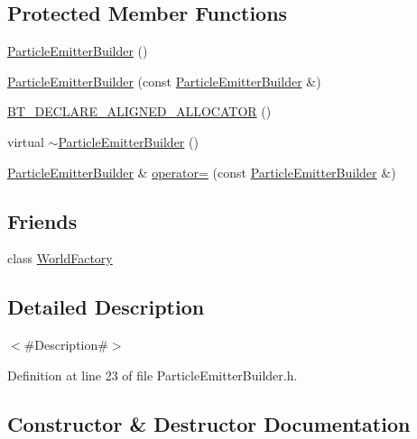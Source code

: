 \subsection*{Protected Member Functions}
\begin{DoxyCompactItemize}
\item 
\mbox{\hyperlink{classnjli_1_1_particle_emitter_builder_a5cd2dd72ac6d8e3a1cbe305e30c6a76a}{Particle\+Emitter\+Builder}} ()
\item 
\mbox{\hyperlink{classnjli_1_1_particle_emitter_builder_a74774e50507001d37a9cfbd9c95fe23f}{Particle\+Emitter\+Builder}} (const \mbox{\hyperlink{classnjli_1_1_particle_emitter_builder}{Particle\+Emitter\+Builder}} \&)
\item 
\mbox{\hyperlink{classnjli_1_1_particle_emitter_builder_a4c80a1c4a4b476508a5ed08ccb066cf7}{B\+T\+\_\+\+D\+E\+C\+L\+A\+R\+E\+\_\+\+A\+L\+I\+G\+N\+E\+D\+\_\+\+A\+L\+L\+O\+C\+A\+T\+OR}} ()
\item 
virtual \mbox{\hyperlink{classnjli_1_1_particle_emitter_builder_af91a252a5c3182ecb94be316d422b744}{$\sim$\+Particle\+Emitter\+Builder}} ()
\item 
\mbox{\hyperlink{classnjli_1_1_particle_emitter_builder}{Particle\+Emitter\+Builder}} \& \mbox{\hyperlink{classnjli_1_1_particle_emitter_builder_a5185f10888f76abc77fecbca032dcd7a}{operator=}} (const \mbox{\hyperlink{classnjli_1_1_particle_emitter_builder}{Particle\+Emitter\+Builder}} \&)
\end{DoxyCompactItemize}
\subsection*{Friends}
\begin{DoxyCompactItemize}
\item 
class \mbox{\hyperlink{classnjli_1_1_particle_emitter_builder_acb96ebb09abe8f2a37a915a842babfac}{World\+Factory}}
\end{DoxyCompactItemize}


\subsection{Detailed Description}
$<$\#\+Description\#$>$ 

Definition at line 23 of file Particle\+Emitter\+Builder.\+h.



\subsection{Constructor \& Destructor Documentation}
\mbox{\label{classnjli_1_1_particle_emitter_builder_a5cd2dd72ac6d8e3a1cbe305e30c6a76a}} 
